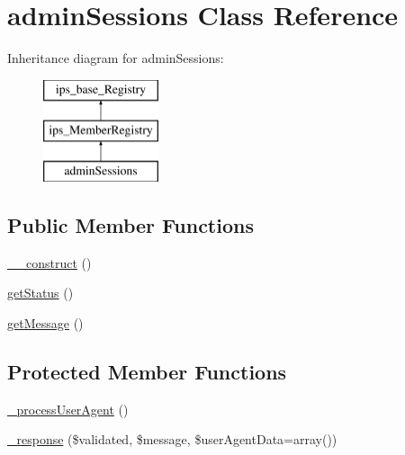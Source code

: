 \hypertarget{classadmin_sessions}{\section{admin\-Sessions Class Reference}
\label{classadmin_sessions}
}
Inheritance diagram for admin\-Sessions\-:\begin{figure}[H]
\begin{center}
\leavevmode
\includegraphics[height=3.000000cm]{classadmin_sessions}
\end{center}
\end{figure}
\subsection*{Public Member Functions}
\begin{DoxyCompactItemize}
\item 
\hyperlink{classadmin_sessions_a095c5d389db211932136b53f25f39685}{\-\_\-\-\_\-construct} ()
\item 
\hyperlink{classadmin_sessions_a9d21636071f529e2154051d3ea6e5921}{get\-Status} ()
\item 
\hyperlink{classadmin_sessions_a0b0e611236742aac18ba1936d03ba89a}{get\-Message} ()
\end{DoxyCompactItemize}
\subsection*{Protected Member Functions}
\begin{DoxyCompactItemize}
\item 
\hyperlink{classadmin_sessions_a1324f1ade589758dd04b3adb2bf0e8f0}{\-\_\-process\-User\-Agent} ()
\item 
\hyperlink{classadmin_sessions_acdf1a0cbdbd400b82b38b392a35e19af}{\-\_\-response} (\$validated, \$message, \$user\-Agent\-Data=array())
\end{DoxyCompactItemize}
